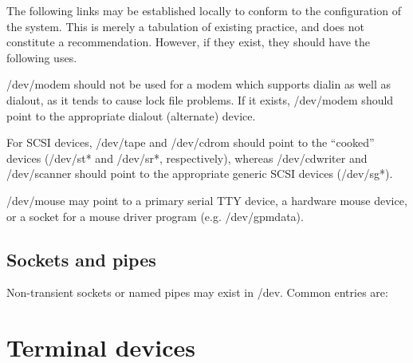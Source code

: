 The following links may be established locally to conform to the
configuration of the system.  This is merely a tabulation of existing
practice, and does not constitute a recommendation.  However, if they
exist, they should have the following uses.

\begin{nodelist}
\end{nodelist}

\noindent
{\file /dev/modem} should not be used for a modem which supports
dialin as well as dialout, as it tends to cause lock file problems.
If it exists, {\file /dev/modem} should point to the appropriate
dialout (alternate) device.

For SCSI devices, {\file /dev/tape} and {\file /dev/cdrom} should
point to the ``cooked'' devices ({\file /dev/st*} and {\file
/dev/sr*}, respectively), whereas {\file /dev/cdwriter} and {\file
/dev/scanner} should point to the appropriate generic SCSI devices
({\file /dev/sg*}).

{\file /dev/mouse} may point to a primary serial TTY device, a
hardware mouse device, or a socket for a mouse driver program
(e.g. {\file /dev/gpmdata}).

\subsection{Sockets and pipes}

Non-transient sockets or named pipes may exist in {\file /dev}.
Common entries are:

\begin{nodelist}
\end{nodelist}

\section{Terminal devices}

